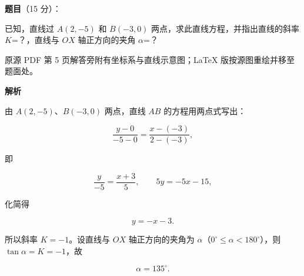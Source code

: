 \begin{answer}

\textbf{题目}（15 分）：

已知，直线过 $A(2,-5)$ 和 $B(-3,0)$ 两点，求此直线方程，并指出直线的斜率 $K$=？，直线与 $OX$ 轴正方向的夹角 $\alpha$=？

\begin{gktip}
原源 PDF 第 5 页解答旁附有坐标系与直线示意图；LaTeX 版按源图重绘并移至题面处。
\end{gktip}
\nopagebreak[4]
\begin{center}\end{center}
\nopagebreak[4]
\textbf{解析}

由 $A(2,-5)$、$B(-3,0)$ 两点，直线 $AB$ 的方程用两点式写出：

\nopagebreak[4]
\[
\frac{y-0}{-5-0}=\frac{x-(-3)}{2-(-3)},
\]

即

\nopagebreak[4]
\[
\frac{y}{-5}=\frac{x+3}{5},
\qquad
5y=-5x-15,
\]

化简得

\nopagebreak[4]
\[
y=-x-3.
\]
\nopagebreak[4]
\begin{center}\end{center}
\nopagebreak[4]
所以斜率 $K=-1$。设直线与 $OX$ 轴正方向的夹角为 $\alpha$（$0^\circ\le\alpha<180^\circ$），则 $\tan\alpha=K=-1$，故

\nopagebreak[4]
\[
\alpha=135^\circ.
\]


\end{answer}